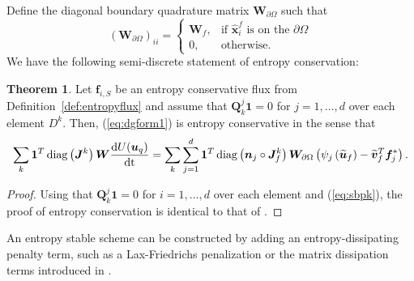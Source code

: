 \documentclass[preprint,10pt]{article}
\theoremstyle{definition}
\theoremstyle{lemma}
\theoremstyle{theorem}
\newtheorem{theorem}{Theorem}
\theoremstyle{assumption}
\DeclareMathOperator{\diag}{diag}
\renewcommand{\hat}{\widehat}
\renewcommand{\tilde}{\widetilde}
\newcommand{\td}[2]{\frac{{\rm d}#1}{{\rm d}{\rm #2}}}
\newcommand{\pd}[2]{\frac{\partial#1}{\partial#2}}
\newcommand{\LRp}[1]{\left( #1 \right)}
\newcommand{\LRs}[1]{\left[ #1 \right]}
\newcommand{\note}[1]{{\color{blue}{#1}}}
\begin{document}
{Define the diagonal boundary quadrature matrix $\bm{W}_{\partial \Omega}$ such that
\[
\LRp{\bm{W}_{\partial \Omega} }_{ii} = \begin{cases}
  \bm{W}_f, & \text{if $\hat{\bm{x}}^f_i$ is on the $\partial \Omega$}\\
0, & \text{otherwise}. 
\end{cases}
\]
We have the following semi-discrete statement of entropy conservation:
\begin{theorem}
  Let $\bm{f}_{i,S}$ be an entropy conservative flux from Definition~\ref{def:entropyflux} and assume that $\bm{Q}^j_k\bm{1} = 0$ for $j = 1,\ldots,d$ over each element $D^k$.  Then, (\ref{eq:dgform1}) is entropy conservative in the sense that
\[
  \sum_k \bm{1}^T\diag\LRp{\bm{J}^k}\bm{W}\td{U(\bm{u}_q)}{t} = \sum_k \sum_{j=1}^d \bm{1}^T\diag\LRp{\bm{n}_j\circ\bm{J}^k_f}\bm{W}_{\partial \Omega} \LRp{\psi_j\LRp{\tilde{\bm{u}}_f}-\tilde{\bm{v}}_f^T\bm{f}_j^*}.
\]
\label{thm:stab1}
\end{theorem}
\begin{proof}
Using that $\bm{Q}^j_k\bm{1} = 0$ for $i = 1,\ldots,d$ over each element and (\ref{eq:sbpk}), the proof of entropy conservation is identical to that of \cite{chan2017discretely}.  
\end{proof}
An entropy stable scheme can be constructed by adding an entropy-dissipating penalty term, such as a Lax-Friedrichs penalization or the matrix dissipation terms introduced in \cite{chandrashekar2013kinetic, winters2017uniquely}.  
\note{maybe add more here?}

}
\end{document}
